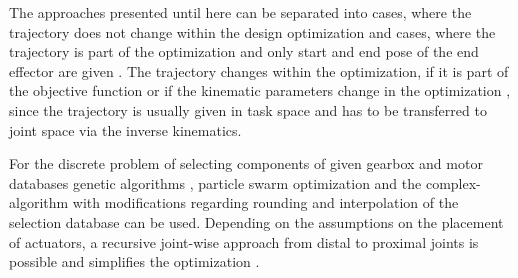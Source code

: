 \documentclass{svproc}
\begin{document}
The approaches presented until here can be separated into cases, where the trajectory does not change within the design optimization \cite{TarkianPerOelFen2011,ZhouBaiHan2011,Padilla-GarciaCruRod2015} and cases, where the trajectory is part of the optimization and only start and end pose of the end effector are given \cite{PetterssonAndKru2005,PetterssonOel2009,TarkianPerOelFen2011}.
The trajectory changes within the optimization, if it is part of the objective function or if the kinematic parameters change in the optimization \cite{TarkianLunOel2008,ZhouBai2015}, since the trajectory is usually given in task space and has to be transferred to joint space via the inverse kinematics.


For the discrete problem of selecting components of given gearbox and motor databases genetic algorithms \cite{TarkianPerOelFen2011,Padilla-GarciaCruRod2015}, particle swarm optimization \cite{RamirezKotOrt2017} and the complex-algorithm with modifications regarding rounding and interpolation of the selection database \cite{PetterssonAndKru2005,ZhouBaiHan2011} can be used.
Depending on the assumptions on the placement of actuators, a recursive joint-wise approach from distal to proximal joints is possible and simplifies the optimization \cite{ChedmailGau1990}.

\end{document}
